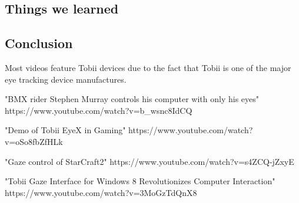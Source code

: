 \documentclass[english]{tktltiki}
\begin{document}
\subsection{Things we learned}



\subsection{Conclusion}












\lastpage

\appendices

\pagestyle{empty}


Most videos feature Tobii devices due to the fact that Tobii is one of the major eye tracking device manufactures.

"BMX rider Stephen Murray controls his computer with only his eyes"
https://www.youtube.com/watch?v=b\_wsnc8IdCQ

"Demo of Tobii EyeX in Gaming"
https://www.youtube.com/watch?v=oSo8fbZfHLk

"Gaze control of StarCraft2"
https://www.youtube.com/watch?v=s4ZCQ-jZxyE

"Tobii Gaze Interface for Windows 8 Revolutionizes Computer Interaction"
https://www.youtube.com/watch?v=3MoGzTdQnX8
\end{document}
